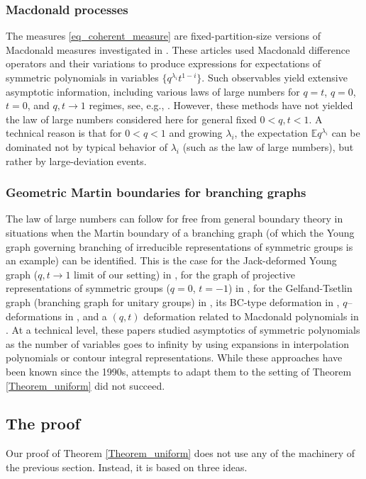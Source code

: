 \documentclass[11pt,reqno]{amsart}
\theoremstyle{definition}
\theoremstyle{remark}
\numberwithin{equation}{section}
\newcommand{\E}{\mathbb E}
\begin{document}
\subsubsection{Macdonald processes}
The measures \eqref{eq_coherent_measure} are fixed-partition-size versions of Macdonald
measures investigated in \cite{BC14,BCGS16}. These articles used Macdonald
difference operators and their variations to produce expressions for expectations of symmetric polynomials in variables
$\{q^{\lambda_i}t^{1-i}\}$. Such observables yield extensive asymptotic information, including various laws of large numbers for $q=t$, $q=0$, $t=0$, and $q,t\to 1$ regimes, see, e.g., \cite{BC14,BoG15,Ahn20}. However,
these methods have not yielded the law of large numbers considered here for general fixed $0<q,t<1$. A technical reason is that for $0<q<1$ and growing $\lambda_i$, the expectation $\E q^{\lambda_i}$ can be dominated not by typical behavior of $\lambda_i$ (such as the law of large numbers), but rather by large-deviation events.


\subsubsection{Geometric Martin boundaries for branching graphs} The law of large numbers can follow for free from general boundary theory in  situations when the Martin boundary of a branching graph (of which the Young graph governing branching of irreducible representations of symmetric groups is an example) can be identified. This is the case for the Jack-deformed Young graph ($q,t\to 1$ limit of our setting) in \cite{KOO98}, for the graph of projective representations of symmetric groups ($q=0$, $t=-1$) in \cite{Naz92,Iva99}, for the Gelfand-Tsetlin graph (branching graph for unitary groups) in \cite{OO98}, its BC-type deformation in \cite{OO06}, $q$--deformations in \cite{Gor12,Pet14,GP15,CG20}, and a $(q,t)$ deformation related to Macdonald polynomials in \cite{Cue18,Ols21}. At a technical level, these papers studied asymptotics of symmetric polynomials as the number of variables goes to infinity by using expansions in interpolation polynomials or contour integral representations. While these approaches have been known since the 1990s, attempts to adapt them to the setting of Theorem \ref{Theorem_uniform} did not succeed.



\subsection{The proof} Our proof of Theorem \ref{Theorem_uniform} does not use any of the machinery
of the previous section. Instead, it is based on three ideas.
\end{document}
